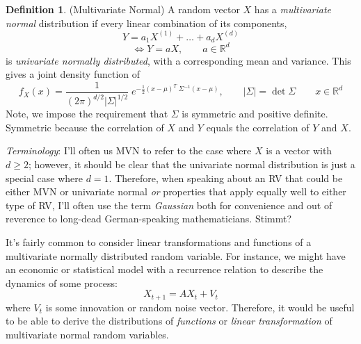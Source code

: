 \documentclass[12pt]{article}
\theoremstyle{plain}
\theoremstyle{definition}
\newtheorem{defn}[thm]{Definition}
\theoremstyle{remark}
\begin{document}
\begin{defn}(Multivariate Normal)
A random vector $X$ has a \emph{multivariate normal}
distribution if every linear combination of its components,
\[ Y = a_1 X^{(1)} + \ldots + a_d X^{(d)} \]
\[ \Leftrightarrow Y = {a} X, \qquad
    {a} \in \mathbb{R}^{d} \]
is \emph{univariate normally
distributed}, with a corresponding mean and variance. This gives a
joint density function of
\begin{equation}
    \label{pdf2}
    f_{X}({x}) = \frac{1}{(2\pi)^{d/2}\lvert \Sigma \rvert^{1/2}}
	\; e^{ -\frac{1}{2} ({x} - \mu)^T \;
	\Sigma^{-1} ({x} - \mu) }, \qquad \lvert\Sigma\rvert =
      \det\Sigma \qquad x \in \mathbb{R}^d
\end{equation}
Note, we impose the requirement that $\Sigma$ is symmetric and positive
definite.  Symmetric because the correlation of $X$ and $Y$ equals the
correlation of $Y$ and $X$.
\end{defn}
{\sl Terminology}: I'll often us MVN to refer to the case where $X$ is
a vector with $d\geq2$; however, it should be clear that the univariate
normal distribution is just a special case where $d=1$. Therefore,
when speaking about an RV that could be either MVN or univariate normal
\emph{or} properties that apply equally well to either
type of RV, I'll often use the term \emph{Gaussian}
both for convenience and out of reverence to long-dead German-speaking
mathematicians. Stimmt?


It's fairly common to consider linear transformations and functions
of a multivariate normally distributed random variable.  For instance,
we might have an economic or statistical model with a recurrence
relation to describe the dynamics of some process:
\[ X_{t+1} = A X_{t} + {V}_{t} \]
where ${V}_t$ is some innovation or random noise vector.
Therefore, it would be useful to be able to derive the distributions
of \emph{functions} or \emph{linear transformation} of multivariate
normal random variables.
\end{document}
